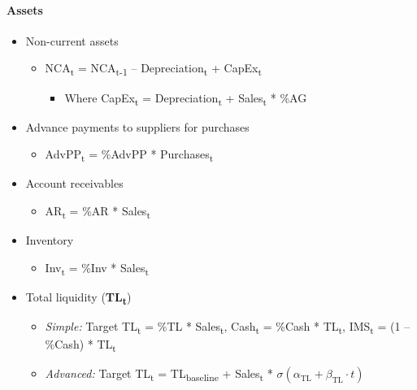\documentclass[12pt,a4paper]{article}
\begin{document}
\paragraph{Assets}

\begin{itemize}
\item
  Non-current assets

  \begin{itemize}
  \item
    NCA\textsubscript{t} = NCA\textsubscript{t-1} --
    Depreciation\textsubscript{t} + CapEx\textsubscript{t}

    \begin{itemize}
    \item
      Where CapEx\textsubscript{t} = Depreciation\textsubscript{t} +
      Sales\textsubscript{t} * \%AG
    \end{itemize}
  \end{itemize}
\item
  Advance payments to suppliers for purchases

  \begin{itemize}
  \item
    AdvPP\textsubscript{t} = \%AdvPP * Purchases\textsubscript{t}
  \end{itemize}
\item
  Account receivables

  \begin{itemize}
  \item
    AR\textsubscript{t} = \%AR * Sales\textsubscript{t}
  \end{itemize}
\item
  Inventory

  \begin{itemize}
  \item
    Inv\textsubscript{t} = \%Inv * Sales\textsubscript{t}
  \end{itemize}
\item
  Total liquidity (\textbf{TL\textsubscript{t}})

  \begin{itemize}
  \item
    \textit{Simple:}\;
    Target TL\textsubscript{t} = \%TL * Sales\textsubscript{t},\;
    Cash\textsubscript{t} = \%Cash * TL\textsubscript{t},\;
    IMS\textsubscript{t} = (1 -- \%Cash) * TL\textsubscript{t}
  \item
    \textit{Advanced:}\;
    Target TL\textsubscript{t} =
    TL\textsubscript{baseline} + Sales\textsubscript{t} *
    $\sigma(\alpha_{\text{TL}} + \beta_{\text{TL}} \cdot t)$


\end{itemize}
\end{itemize}
\end{document}
